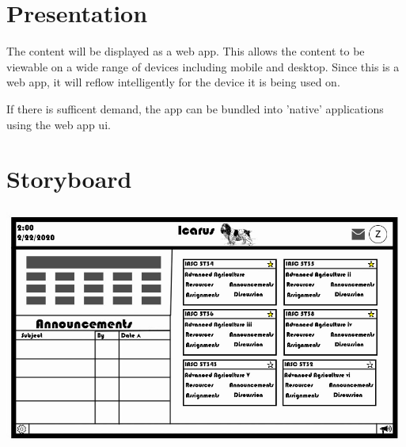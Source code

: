 \documentclass[12pt]{article}
\begin{document}
    \section{Presentation}\label{sec:presentation}

    The content will be displayed as a web app.
    This allows the content to be viewable on a wide range of devices including mobile and desktop.
    Since this is a web app, it will reflow intelligently for the device it is being used on.

    If there is sufficent demand, the app can be bundled into 'native' applications using the web app ui.


    \section{Storyboard}\label{sec:storyboard}

    \includegraphics[width=\textwidth]{StoryBoard.jpg}
\end{document}

